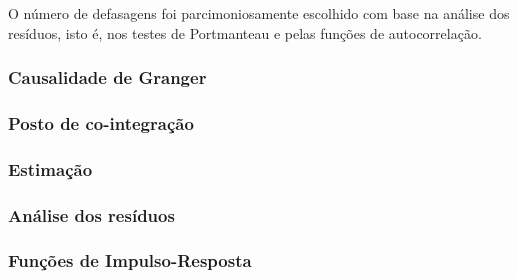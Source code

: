 \documentclass[a4paper,
               article,
               12pt,
               openany,
               oneside,
               english,
               brazil]{abntex2}
\numberwithin{equation}{section}
\begin{document}
    O número de defasagens foi parcimoniosamente escolhido com base na análise dos resíduos, isto é, nos testes de Portmanteau e pelas funções de autocorrelação.

    \subsubsection{Causalidade de Granger}

    \begin{table}
    \end{table}

    \subsubsection{Posto de co-integração}

    \subsubsection{Estimação}

    \subsubsection{Análise dos resíduos}

    \subsubsection{Funções de Impulso-Resposta}
    

\newpage
\printbibliography
\end{document}
